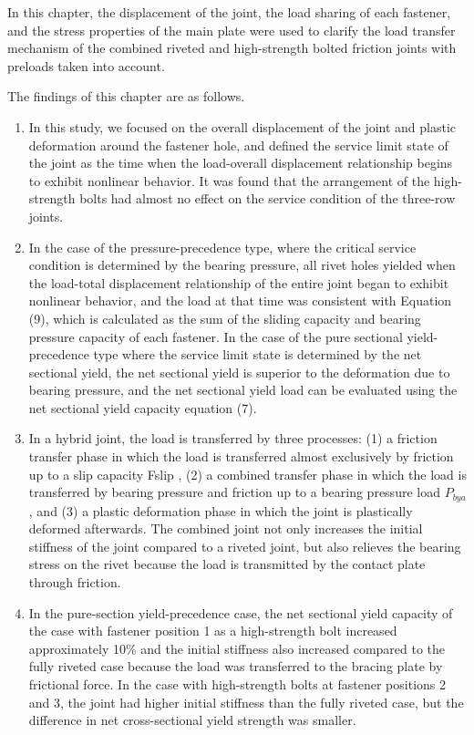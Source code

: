 In this chapter, the displacement of the joint, the load sharing of each fastener, and the stress properties of the main plate were used to clarify the load transfer mechanism of the combined riveted and high-strength bolted friction joints with preloads taken into account.

The findings of this chapter are as follows.

\begin{enumerate}
    \item In this study, we focused on the overall displacement of the joint and plastic deformation around the fastener hole, and defined the service limit state of the joint as the time when the load-overall displacement relationship begins to exhibit nonlinear behavior. It was found that the arrangement of the high-strength bolts had almost no effect on the service condition of the three-row joints.

    \item  In the case of the pressure-precedence type, where the critical service condition is determined by the bearing pressure, all rivet holes yielded when the load-total displacement relationship of the entire joint began to exhibit nonlinear behavior, and the load at that time was consistent with Equation (9), which is calculated as the sum of the sliding capacity and bearing pressure capacity of each fastener. In the case of the pure sectional yield-precedence type where the service limit state is determined by the net sectional yield, the net sectional yield is superior to the deformation due to bearing pressure, and the net sectional yield load can be evaluated using the net sectional yield capacity equation (7).

    \item  In a hybrid joint, the load is transferred by three processes: (1) a friction transfer phase in which the load is transferred almost exclusively by friction up to a slip capacity Fslip , (2) a combined transfer phase in which the load is transferred by bearing pressure and friction up to a bearing pressure load $P_{bya}$ , and (3) a plastic deformation phase in which the joint is plastically deformed afterwards. The combined joint not only increases the initial stiffness of the joint compared to a riveted joint, but also relieves the bearing stress on the rivet because the load is transmitted by the contact plate through friction.

    \item  In the pure-section yield-precedence case, the net sectional yield capacity of the case with fastener position 1 as a high-strength bolt increased approximately 10\% and the initial stiffness also increased compared to the fully riveted case because the load was transferred to the bracing plate by frictional force. In the case with high-strength bolts at fastener positions 2 and 3, the joint had higher initial stiffness than the fully riveted case, but the difference in net cross-sectional yield strength was smaller.


\end{enumerate}

